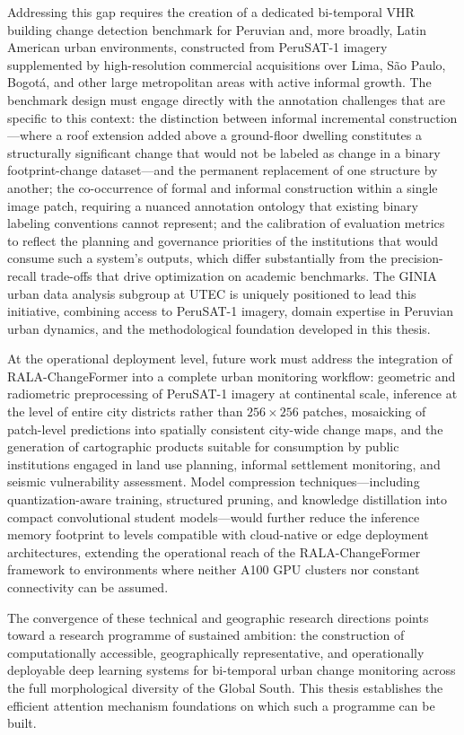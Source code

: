 Addressing this gap requires the creation of a dedicated bi-temporal VHR building
change detection benchmark for Peruvian and, more broadly, Latin American urban
environments, constructed from PeruSAT-1 imagery supplemented by high-resolution
commercial acquisitions over Lima, São Paulo, Bogotá, and other large metropolitan
areas with active informal growth. The benchmark design must engage directly with
the annotation challenges that are specific to this context: the distinction
between informal incremental construction---where a roof extension added above a
ground-floor dwelling constitutes a structurally significant change that would
not be labeled as change in a binary footprint-change dataset---and the permanent
replacement of one structure by another; the co-occurrence of formal and informal
construction within a single image patch, requiring a nuanced annotation ontology
that existing binary labeling conventions cannot represent; and the calibration
of evaluation metrics to reflect the planning and governance priorities of the
institutions that would consume such a system's outputs, which differ
substantially from the precision-recall trade-offs that drive optimization on
academic benchmarks. The GINIA urban data analysis subgroup at UTEC is uniquely
positioned to lead this initiative, combining access to PeruSAT-1 imagery,
domain expertise in Peruvian urban dynamics, and the methodological foundation
developed in this thesis.

At the operational deployment level, future work must address the integration
of RALA-ChangeFormer into a complete urban monitoring workflow: geometric and
radiometric preprocessing of PeruSAT-1 imagery at continental scale, inference
at the level of entire city districts rather than $256 \times 256$ patches,
mosaicking of patch-level predictions into spatially consistent city-wide change
maps, and the generation of cartographic products suitable for consumption by
public institutions engaged in land use planning, informal settlement monitoring,
and seismic vulnerability assessment. Model compression techniques---including
quantization-aware training, structured pruning, and knowledge distillation into
compact convolutional student models---would further reduce the inference memory
footprint to levels compatible with cloud-native or edge deployment architectures,
extending the operational reach of the RALA-ChangeFormer framework to
environments where neither A100 GPU clusters nor constant connectivity can be
assumed.

The convergence of these technical and geographic research directions points toward a research programme of sustained ambition: the construction of computationally accessible, geographically representative, and operationally deployable deep learning systems for bi-temporal urban change monitoring across the full morphological diversity of the Global South. This thesis establishes the efficient attention mechanism foundations on which such a programme can be built.
